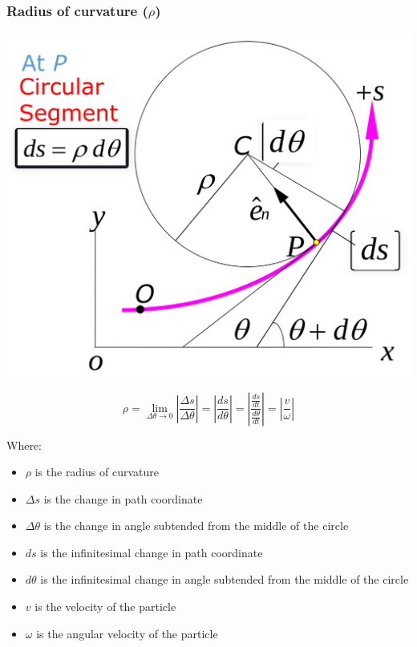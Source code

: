 \documentclass[11pt]{article}
\begin{document}
\subsubsection{Radius of curvature (\(\rho\))}
\label{sec:org0ba3f4e}
\begin{center}
\includegraphics[width=.9\linewidth]{./images/radius-of-curvature-in-path-coordinate-system.png}
\end{center}
\[\rho = \lim_{\Delta \theta \rightarrow 0} \left|\frac{\Delta s}{\Delta \theta} \right| = \left| \frac{ds}{d \theta} \right| = \left| \frac{\frac{ds}{dt}}{\frac{d \theta}{dt}} \right| = \left| \frac{v}{\omega} \right|\]

Where:
\begin{itemize}
\item \(\rho\) is the radius of curvature
\item \(\Delta s\) is the change in path coordinate
\item \(\Delta \theta\) is the change in angle subtended from the middle of the circle
\item \(ds\) is the infinitesimal change in path coordinate
\item \(d \theta\) is the infinitesimal change in angle subtended from the middle of the circle
\item \(v\) is the velocity of the particle
\item \(\omega\) is the angular velocity of the particle
\end{itemize}
\end{document}
